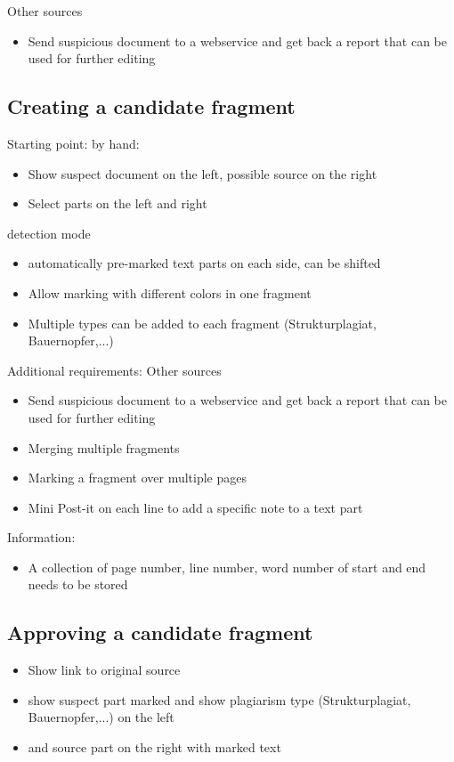 Other sources
\begin{itemize}
\item Send suspicious document to a webservice and get back a report that can be used for further editing 
\end{itemize}

\subsection{Creating a candidate fragment}

Starting point:
\minisec{}
 by hand:
\begin{itemize}
\item Show suspect document on the left, possible source on the right
\item  Select parts on the left and right
\end{itemize}

detection mode
\begin{itemize}
\item automatically pre-marked text parts on each side, can be shifted
\end{itemize}

\begin{itemize}
\item Allow marking with different colors in one fragment
\item Multiple types can be added to each fragment  (Strukturplagiat, Bauernopfer,...)
\end{itemize}

Additional requirements:
Other sources
\begin{itemize}
\item Send suspicious document to a webservice and get back a report that can be used for further editing 
\item Merging multiple fragments
\item Marking a fragment over multiple pages
\item Mini Post-it on each line to add a specific note to a text part
\end{itemize}

Information:
\begin{itemize}
\item  A collection of page number, line number, word number of start and end  needs to be stored
\end{itemize}

\subsection{Approving a candidate fragment}
\begin{itemize}
\item  Show link to original source
\item show suspect part marked and show plagiarism type (Strukturplagiat, Bauernopfer,...) on the left
\item and source part on the right with marked text
\end{itemize}

